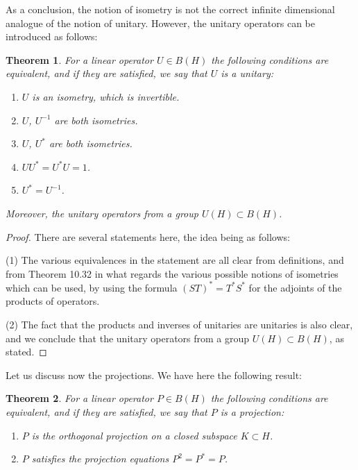 \documentclass[12pt]{amsbook}
\newtheorem{theorem}{Theorem}[chapter]
\begin{document}
As a conclusion, the notion of isometry is not the correct infinite dimensional analogue of the notion of unitary. However, the unitary operators can be introduced as follows:


\begin{theorem}
For a linear operator $U\in B(H)$ the following conditions are equivalent, and if they are satisfied, we say that $U$ is a unitary:
\begin{enumerate}
\item $U$ is an isometry, which is invertible.

\item $U$, $U^{-1}$ are both isometries.

\item $U$, $U^*$ are both isometries.

\item $UU^*=U^*U=1$.

\item $U^*=U^{-1}$.
\end{enumerate}
Moreover, the unitary operators from a group $U(H)\subset B(H)$.
\end{theorem}

\begin{proof}
There are several statements here, the idea being as follows:

\medskip

(1) The various equivalences in the statement are all clear from definitions, and from Theorem 10.32 in what regards the various possible notions of isometries which can be used, by using the formula $(ST)^*=T^*S^*$ for the adjoints of the products of operators.

\medskip

(2) The fact that the products and inverses of unitaries are unitaries is also clear, and we conclude that the unitary operators from a group $U(H)\subset B(H)$, as stated.
\end{proof}

Let us discuss now the projections. We have here the following result:


\begin{theorem}
For a linear operator $P\in B(H)$ the following conditions are equivalent, and if they are satisfied, we say that $P$ is a projection:
\begin{enumerate}
\item $P$ is the orthogonal projection on a closed subspace $K\subset H$.

\item $P$ satisfies the projection equations $P^2=P^*=P$.
\end{enumerate}
\end{theorem}
\end{document}
